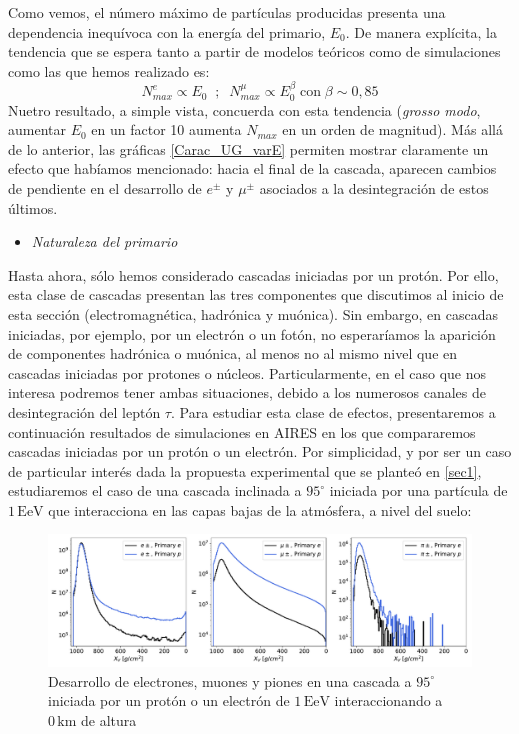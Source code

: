 \documentclass[12 pt, a4paper]{article} %
\numberwithin{equation}{section}
\numberwithin{figure}{section}
\numberwithin{table}{section}
\begin{document}
Como vemos, el número máximo de partículas producidas presenta una dependencia inequívoca con la energía del primario, $E_0$. De manera explícita, la tendencia que se espera tanto a partir de modelos teóricos como de simulaciones como las que hemos realizado es:
\begin{equation}
	N_{max}^{e}\propto E_0\;\;;\;\;N_{max}^{\mu}\propto E_0^\beta\;\text{con}\;\beta\sim0,85\label{ec25}
\end{equation}
Nuetro resultado, a simple vista, concuerda con esta tendencia (\textit{grosso modo}, aumentar $E_0$ en un factor 10 aumenta $N_{max}$ en un orden de magnitud). Más allá de lo anterior, las gráficas \ref{Carac_UG_varE} permiten mostrar claramente un efecto que habíamos mencionado: hacia el final de la cascada, aparecen cambios de pendiente en el desarrollo de $e^\pm$ y $\mu^\pm$ asociados a la desintegración de estos últimos.
\begin{itemize}
	\item \textit{Naturaleza del primario}
\end{itemize}
Hasta ahora, sólo hemos considerado cascadas iniciadas por un protón. Por ello, esta clase de cascadas presentan las tres componentes que discutimos al inicio de esta sección (electromagnética, hadrónica y muónica). Sin embargo, en cascadas iniciadas, por ejemplo, por un electrón o un fotón, no esperaríamos la aparición de componentes hadrónica o muónica, al menos no al mismo nivel que en cascadas iniciadas por protones o núcleos. Particularmente, en el caso que nos interesa podremos tener ambas situaciones, debido a los numerosos canales de desintegración del leptón $\tau$. Para estudiar esta clase de efectos, presentaremos a continuación resultados de simulaciones en AIRES en los que compararemos cascadas iniciadas por un protón o un electrón. Por simplicidad, y por ser un caso de particular interés dada la propuesta experimental que se planteó en \ref{sec1}, estudiaremos el caso de una cascada inclinada a $95^\circ$ iniciada por una partícula de $1\,\mathrm{EeV}$ que interacciona en las capas bajas de la atmósfera, a nivel del suelo:

\begin{figure}[H]
	\centering
	\includegraphics[width=1\linewidth]{figures/cascadas/upgoing_pe_1EeV_95deg_0km}
	\caption{Desarrollo de electrones, muones y piones en una cascada a $95^\circ$ iniciada por un protón o un electrón de $1\,\mathrm{EeV}$ interaccionando a $0\,\mathrm{km}$ de altura}
	\label{Carac_UG_varprim}
\end{figure}
\end{document}
